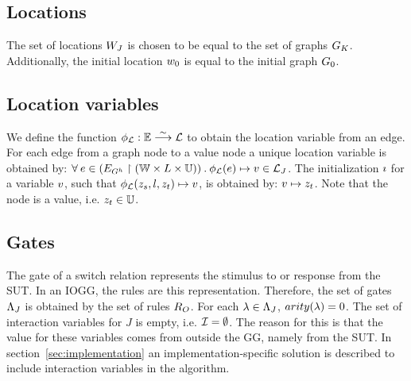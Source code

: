 \subsection{Locations}
The set of locations $W_J$ is chosen to be equal to the set of graphs $G_K$. Additionally, the initial location $w_0$ is equal to the initial graph $G_0$.

\subsection{Location variables}
We define the function $\phi_{\mathcal{L}}: \mathbb{E} \stackrel{\sim}{\longrightarrow} \mathcal{L}$ to obtain the location variable from an edge. For each edge from a graph node to a value node a unique location variable is obtained by: $\forall\: e \in (E_{G^h}\restriction(\mathbb{W} \times L \times \mathbb{U}))\: .\: \phi_{\mathcal{L}}(e) \mapsto v \in \mathcal{L}_J$. The initialization $\imath$ for a variable $v$, such that $\phi_{\mathcal{L}}(z_s, l, z_t) \mapsto v$, is obtained by: $v \mapsto z_t$. Note that the node is a value, i.e. $z_t \in \mathbb{U}$.

\subsection{Gates}
The gate of a switch relation represents the stimulus to or response from the SUT. In an IOGG, the rules are this representation. Therefore, the set of gates $\Lambda_J$ is obtained by the set of rules $R_O$. For each $\lambda \in \Lambda_J$, $arity(\lambda) = 0$. The set of interaction variables for $J$ is empty, i.e. $\mathcal{I} = \emptyset$. The reason for this is that the value for these variables comes from outside the GG, namely from the SUT. In section~\ref{sec:implementation} an implementation-specific solution is described to include interaction variables in the algorithm. 

